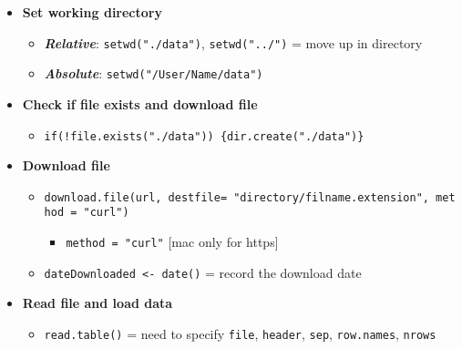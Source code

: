 \documentclass[
]{article}
\providecommand{\tightlist}{%
  \setlength{\itemsep}{0pt}\setlength{\parskip}{0pt}}
\begin{document}
\begin{itemize}
\tightlist
\item
  \textbf{Set working directory}

  \begin{itemize}
  \tightlist
  \item
    \textbf{\emph{Relative}}: \texttt{setwd("./data")},
    \texttt{setwd("../")} = move up in directory
  \item
    \textbf{\emph{Absolute}}: \texttt{setwd("/User/Name/data")}
  \end{itemize}
\item
  \textbf{Check if file exists and download file}

  \begin{itemize}
  \tightlist
  \item
    \texttt{if(!file.exists("./data"))\ \{dir.create("./data")\}}
  \end{itemize}
\item
  \textbf{Download file}

  \begin{itemize}
  \tightlist
  \item
    \texttt{download.file(url,\ destfile=\ "directory/filname.extension",\ method\ =\ "curl")}

    \begin{itemize}
    \tightlist
    \item
      \texttt{method\ =\ "curl"} {[}mac only for https{]}
    \end{itemize}
  \item
    \texttt{dateDownloaded\ \textless{}-\ date()} = record the download
    date
  \end{itemize}
\item
  \textbf{Read file and load data}

  \begin{itemize}
  \tightlist
  \item
    \texttt{read.table()} = need to specify \texttt{file},
    \texttt{header}, \texttt{sep}, \texttt{row.names}, \texttt{nrows}


\end{itemize}
\end{itemize}
\end{document}
